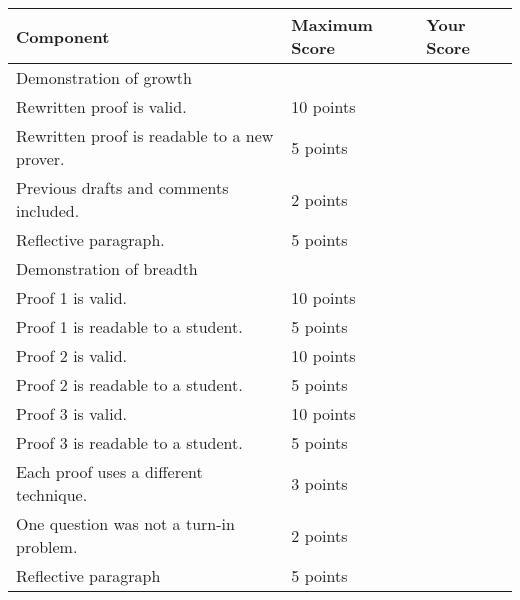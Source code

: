 \documentclass[12pt]{article}
\begin{document}
\begin{tabular}{|p{4in}|p{1.25in}||p{1.05in}|}
\hline
Component & Maximum Score & Your Score \\
\hline
Demonstration of growth &  &  \\
\hspace{0.25in} Rewritten proof is valid. & 10 points &\underline{\hspace{1in}}\\
\hspace{0.25in} Rewritten proof is readable to a new prover. & 5 points &\underline{\hspace{1in}}\\
\hspace{0.25in} Previous drafts and comments included. & 2 points & \underline{\hspace{1in}}\\
\hspace{0.25in} Reflective paragraph. & 5 points & \underline{\hspace{1in}}\\
\hline
Demonstration of breadth & & \\
\hspace{0.25in} Proof 1 is valid.  & 10 points &\underline{\hspace{1in}}\\
\hspace{0.25in} Proof 1 is readable to a student.  & 5 points &\underline{\hspace{1in}}\\
\hspace{0.25in} Proof 2 is valid.  & 10 points &\underline{\hspace{1in}}\\
\hspace{0.25in} Proof 2 is readable to a student. & 5 points &\underline{\hspace{1in}}\\
\hspace{0.25in} Proof 3 is valid.  & 10 points &\underline{\hspace{1in}}\\
\hspace{0.25in} Proof 3 is readable to a student. & 5 points &\underline{\hspace{1in}}\\
\hspace{0.25in} Each proof uses a different technique.  & 3 points &\underline{\hspace{1in}}\\
\hspace{0.25in} One question was not a turn-in problem. & 2 points & \underline{\hspace{1in}}\\
\hspace{0.25in} Reflective paragraph  & 5 points &\underline{\hspace{1in}}\\


\end{tabular}
\end{document}
